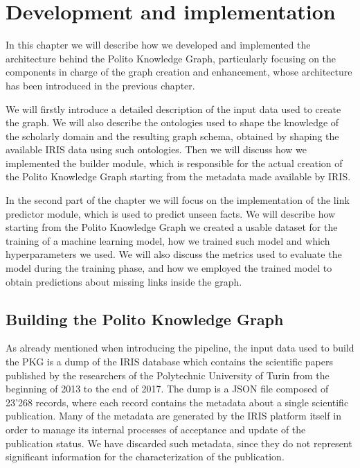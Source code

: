 \documentclass[%
    corpo=13.5pt,
    twoside,
    oldstyle,
    tipotesi=magistrale,
    greek,
    evenboxes
]{toptesi}
\begin{document}
\chapter{Development and implementation}

In this chapter we will describe how we developed and implemented the
architecture behind the Polito Knowledge Graph, particularly focusing
on the components in charge of the graph creation and enhancement, whose
architecture has been introduced in the previous chapter.

We will firstly introduce a detailed description of the input data used to
create the graph. We will also describe the ontologies used to shape the
knowledge of the scholarly domain and the resulting graph schema, obtained
by shaping the available IRIS data using such ontologies.
Then we will discuss how we implemented the builder module, which is
responsible for the actual creation of the Polito Knowledge Graph starting
from the metadata made available by IRIS.

In the second part of the chapter we will focus on the implementation of the
link predictor module, which is used to predict unseen facts.
We will describe how starting from the Polito Knowledge Graph we created
a usable dataset for the training of a machine learning model, how we
trained such model and which hyperparameters we used. We will also discuss
the metrics used to evaluate the model during the training phase, and how we
employed the trained model to obtain predictions about missing links
inside the graph.


\section{Building the Polito Knowledge Graph}
\label{sec:buildingpkg}

As already mentioned when introducing the pipeline, the input data used to
build the PKG is a dump of the IRIS database which contains the
scientific papers published by the researchers of the Polytechnic University
of Turin from the beginning of 2013 to the end of 2017.
The dump is a JSON file composed of 23'268 records, where each record contains
the metadata about a single scientific publication.
Many of the metadata are generated by the IRIS platform itself in
order to manage its internal processes of acceptance and update of the
publication status. We have discarded such metadata, since they do not
represent significant information for the characterization of the publication.
\end{document}

